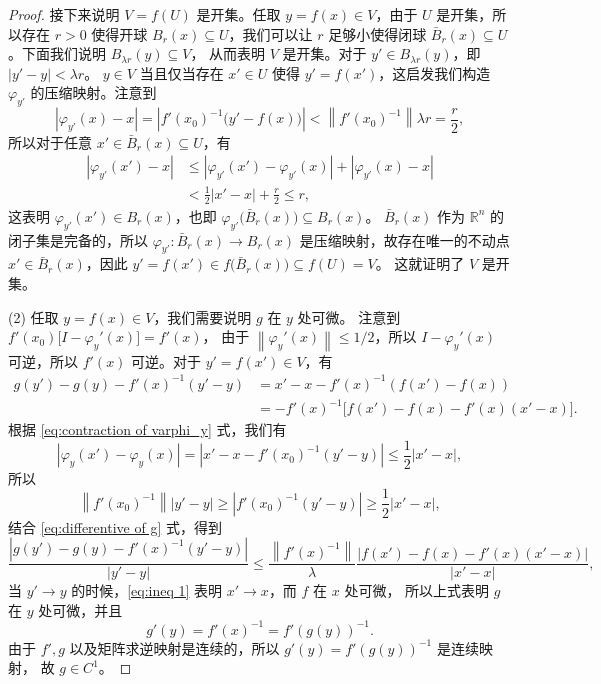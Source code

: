 \documentclass[fontset=none,zihao=-4]{Notes}
\newcommand{\norm}[1]{\left\lVert#1\right\rVert}
\newcommand{\abs}[1]{\left\lvert#1\right\rvert}
\begin{document}
\begin{proof}
  接下来说明 $V=f(U)$ 是开集。任取 $y=f(x)\in V$，由于 $U$ 是开集，所以存在
  $r>0$ 使得开球 $B_r(x)\subseteq U$，我们可以让 $r$ 足够小使得闭球
  $\bar B_r(x)\subseteq U$。下面我们说明 $B_{\lambda r}(y)\subseteq V$，
  从而表明 $V$ 是开集。对于 $y'\in B_{\lambda r}(y)$，即 $\abs{y'-y}<\lambda r$。
  $y\in V$ 当且仅当存在 $x'\in U$ 使得 $y'=f(x')$，这启发我们构造 $\varphi_{y'}$
  的压缩映射。注意到
  \[
    \abs{\varphi_{y'}(x)-x}=\abs{f'(x_0)^{-1}\bigl(y'-f(x)\bigr)}  
    < \norm{f'(x_0)^{-1}}\lambda r=\frac{r}{2},
  \]
  所以对于任意 $x'\in \bar B_{r}(x)\subseteq U$，有
  \begin{align*}
    \abs{\varphi_{y'}(x')-x}&\leq\abs{\varphi_{y'}(x')-\varphi_{y'}(x)}+\abs{\varphi_{y'}(x)-x}\\
    &< \frac{1}{2}\abs{x'-x}+\frac{r}{2}\leq r,
  \end{align*}
  这表明 $\varphi_{y'}(x')\in B_r(x)$，也即 $\varphi_{y'}\bigl(\bar B_r(x)\bigr)\subseteq B_r(x)$。
  $\bar B_r(x)$ 作为 $\mathbb{R}^n$ 的闭子集是完备的，所以 $\varphi_{y'}:\bar B_r(x)\to B_r(x)$
  是压缩映射，故存在唯一的不动点 $x'\in\bar B_r(x)$，因此 $y'=f(x')\in f\bigl(\bar B_r(x)\bigr)\subseteq f(U)=V$。
  这就证明了 $V$ 是开集。

  (2) 任取 $y=f(x)\in V$，我们需要说明 $g$ 在 $y$ 处可微。
  注意到 $f'(x_0)\bigl[I-\varphi_y'(x)\bigr]=f'(x)$，
  由于 $\norm{\varphi_y'(x)}\leq 1/2$，所以 $I-\varphi_y'(x)$ 可逆，所以
  $f'(x)$ 可逆。对于 $y'=f(x')\in V$，有
  \begin{equation}\label{eq:differentive of g}
    \begin{aligned}
      g(y')-g(y)-f'(x)^{-1}  (y'-y)&=x'-x-f'(x)^{-1}(f(x')-f(x))\\
      &=-f'(x)^{-1}\bigl[f(x')-f(x)-f'(x)(x'-x)\bigr].
    \end{aligned}
  \end{equation}
  根据 \eqref{eq:contraction of varphi_y} 式，我们有
  \[
    \abs{\varphi_y(x')-\varphi_y(x)}= \abs{x'-x-f'(x_0)^{-1}(y'-y)}\leq \frac{1}{2}\abs{x'-x} ,
  \]
  所以  
  \begin{equation}\label{eq:ineq 1}
    \norm{f'(x_0)^{-1}}\abs{y'-y}\geq \abs{f'(x_0)^{-1}(y'-y)}\geq \frac{1}{2}\abs{x'-x},   
  \end{equation}
  结合 \eqref{eq:differentive of g} 式，得到
  \[
    \frac{\abs{g(y')-g(y)-f'(x)^{-1}  (y'-y)}}{\abs{y'-y}}\leq
    \frac{\norm{f'(x)^{-1}}}{\lambda} \frac{\abs{f(x')-f(x)-f'(x)(x'-x)}}{\abs{x'-x}},
  \]
  当 $y'\to y$ 的时候，\eqref{eq:ineq 1} 表明 $x'\to x$，而 $f$ 在 $x$ 处可微，
  所以上式表明 $g$ 在 $y$ 处可微，并且
  \[
    g'(y)=f'(x)^{-1}=f'(g(y))^{-1}.  
  \]
  由于 $f',g$ 以及矩阵求逆映射是连续的，所以 $g'(y)=f'(g(y))^{-1}$ 是连续映射，
  故 $g\in C^1$。
\end{proof}
\end{document}
